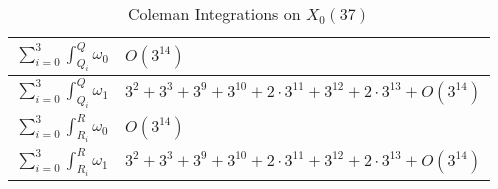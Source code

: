 \begin{itemize}
\begin{table}[h]
\begin{tabular}{|l|l|}
        $\sum_{i=0}^{3}\int^Q_{Q_i} \omega_0 $   &$O(3^{14}) $
            \rule{0pt}{4ex} \\
\hline
            \rule{0pt}{4ex}
        $\sum_{i=0}^{3}\int^Q_{Q_i} \omega_1 $  & $3^{2} + 3^{3} + 3^{9} + 3^{10} + 2\cdot 3^{11} +  3^{12} + 2\cdot 3^{13}+ O(3^{14})$
            \rule{0pt}{4ex}
\\\hline
            \rule{0pt}{4ex}
       $\sum_{i=0}^{3}\int^R_{R_i} \omega_0 $  &$O(3^{14}) $    \rule{0pt}{4ex}    
\\\hline
           \rule{0pt}{4ex}    
        $\sum_{i=0}^{3}\int^R_{R_i} \omega_1 $ &$3^{2} + 3^{3} + 3^{9} + 3^{10} + 2\cdot 3^{11} +  3^{12} + 2\cdot 3^{13}+ O(3^{14})$      \rule{0pt}{4ex}    
\\\hline
        
    \end{tabular}
    \caption{Coleman Integrations on $X_0(37)$}
    \label{table:X_0_37_results}
\end{table}

\end{itemize}